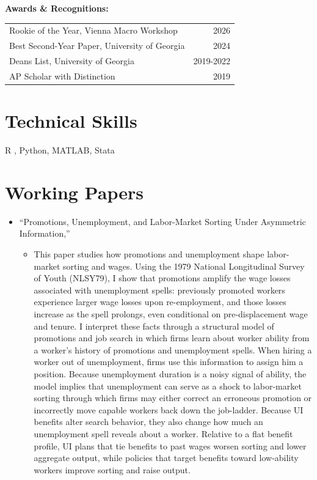 \documentclass[11pt,a4paper]{article}
\begin{document}
	\textbf{Awards \& Recognitions:} \\
	{\footnotesize
		\begin{tabular*}{\linewidth}{@{}l@{\extracolsep{\fill}}r@{}}
			\textbullet{} Rookie of the Year, Vienna Macro Workshop & 2026 \\
			\textbullet{} Best Second-Year Paper, University of Georgia & 2024 \\
			\textbullet{} Deans List, University of Georgia & 2019-2022 \\
			\textbullet{} AP Scholar with Distinction & 2019 \\
		\end{tabular*}
	}
	
	\section{Technical Skills}
	R , Python, MATLAB, Stata
	
	\section{Working Papers}

	\begin{itemize}
		\item[1.] ``Promotions, Unemployment, and Labor-Market Sorting Under Asymmetric Information,'' 
		\begin{itemize} \footnotesize 
			\item[] This paper studies how promotions and unemployment shape labor-market sorting and wages. 
              Using the 1979 National Longitudinal Survey of Youth (NLSY79), I show that promotions amplify 
              the wage losses associated with unemployment spells: previously promoted workers experience 
              larger wage losses upon re-employment, and those losses increase as the spell prolongs, even 
              conditional on pre-displacement wage and tenure. I interpret these facts through a structural 
              model of promotions and job search in which firms learn about worker ability from a worker's 
              history of promotions and unemployment spells. When hiring a worker out of unemployment, firms 
              use this information to assign him a position. Because unemployment duration is a noisy signal 
              of ability, the model implies that unemployment can serve as a shock to labor-market sorting 
              through which firms may either correct an erroneous promotion or incorrectly move capable 
              workers back down the job-ladder. Because UI benefits alter search behavior, they also change 
              how much an unemployment spell reveals about a worker. Relative to a flat benefit profile, UI 
              plans that tie benefits to past wages worsen sorting and lower aggregate output, while policies 
              that target benefits toward low-ability workers improve sorting and raise output.
		\end{itemize}
	\end{itemize}
\end{document}
